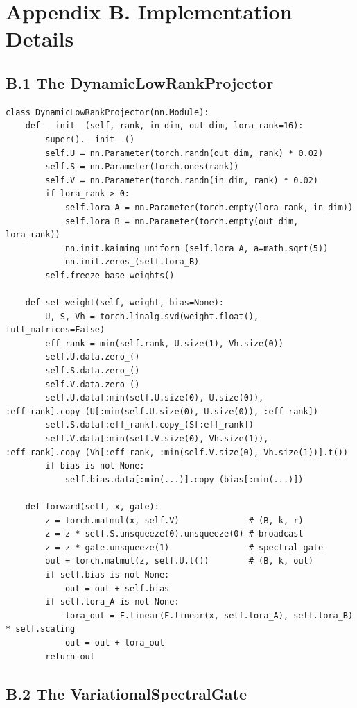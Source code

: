 \section{Appendix B. Implementation Details}

\subsection{B.1 The DynamicLowRankProjector}

\begin{lstlisting}
class DynamicLowRankProjector(nn.Module):
    def __init__(self, rank, in_dim, out_dim, lora_rank=16):
        super().__init__()
        self.U = nn.Parameter(torch.randn(out_dim, rank) * 0.02)
        self.S = nn.Parameter(torch.ones(rank))
        self.V = nn.Parameter(torch.randn(in_dim, rank) * 0.02)
        if lora_rank > 0:
            self.lora_A = nn.Parameter(torch.empty(lora_rank, in_dim))
            self.lora_B = nn.Parameter(torch.empty(out_dim, lora_rank))
            nn.init.kaiming_uniform_(self.lora_A, a=math.sqrt(5))
            nn.init.zeros_(self.lora_B)
        self.freeze_base_weights()
    
    def set_weight(self, weight, bias=None):
        U, S, Vh = torch.linalg.svd(weight.float(), full_matrices=False)
        eff_rank = min(self.rank, U.size(1), Vh.size(0))
        self.U.data.zero_()
        self.S.data.zero_()
        self.V.data.zero_()
        self.U.data[:min(self.U.size(0), U.size(0)), :eff_rank].copy_(U[:min(self.U.size(0), U.size(0)), :eff_rank])
        self.S.data[:eff_rank].copy_(S[:eff_rank])
        self.V.data[:min(self.V.size(0), Vh.size(1)), :eff_rank].copy_(Vh[:eff_rank, :min(self.V.size(0), Vh.size(1))].t())
        if bias is not None:
            self.bias.data[:min(...)].copy_(bias[:min(...)])
    
    def forward(self, x, gate):
        z = torch.matmul(x, self.V)              # (B, k, r)
        z = z * self.S.unsqueeze(0).unsqueeze(0) # broadcast
        z = z * gate.unsqueeze(1)                # spectral gate
        out = torch.matmul(z, self.U.t())        # (B, k, out)
        if self.bias is not None:
            out = out + self.bias
        if self.lora_A is not None:
            lora_out = F.linear(F.linear(x, self.lora_A), self.lora_B) * self.scaling
            out = out + lora_out
        return out
\end{lstlisting}

\subsection{B.2 The VariationalSpectralGate}

